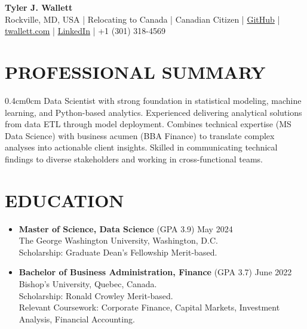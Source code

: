 \documentclass[a4paper,9pt]{extarticle}
\begin{document}
\thispagestyle{firstpage}

\begin{center}
\textbf{\Huge Tyler J. Wallett }\\[3pt] %
Rockville, MD, USA | Relocating to Canada | Canadian Citizen | \href{https://github.com/twallett}{GitHub} | \href{https://www.twallett.com}{twallett.com} | \href{https://www.linkedin.com/in/twallett/}{LinkedIn} | +1 (301) 318-4569  %
\end{center}

\section*{PROFESSIONAL SUMMARY}

\begin{adjustwidth}{0.4cm}{0cm}
Data Scientist with strong foundation in statistical modeling, machine learning, and Python-based analytics. Experienced delivering analytical solutions from data ETL through model deployment. Combines technical expertise (MS Data Science) with business acumen (BBA Finance) to translate complex analyses into actionable client insights. Skilled in communicating technical findings to diverse stakeholders and working in cross-functional teams.
\end{adjustwidth}


\section*{EDUCATION}

\begin{itemize}[leftmargin=0.4cm, label={}]
    \item \textbf{Master of Science, Data Science} (GPA 3.9) \hfill May 2024 \\ 
    The George Washington University, Washington, D.C. \\ 
    Scholarship: Graduate Dean's Fellowship Merit-based.
\end{itemize}

\noindent
\begin{itemize}[leftmargin=0.4cm, label={}]
    \item \textbf{Bachelor of Business Administration, Finance} (GPA 3.7) \hfill June 2022 \\
    Bishop's University, Quebec, Canada. \\ 
    Scholarship: Ronald Crowley Merit-based. \\
    Relevant Coursework: Corporate Finance, Capital Markets, Investment Analysis, Financial Accounting.
\end{itemize}
\end{document}
